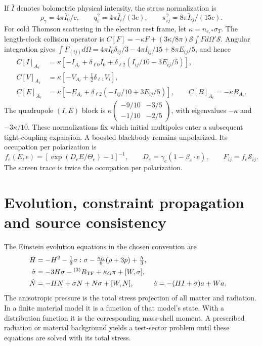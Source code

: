 If $\bar I$ denotes bolometric physical intensity, the stress normalization is
\begin{equation}
 \rho_\gamma=4\pi\bar I_0/c,\qquad
 q_i^\gamma=4\pi\bar I_i/(3c),\qquad
 \pi_{ij}^\gamma=8\pi\bar I_{ij}/(15c).
 \label{geo:intensity_stress}
\end{equation}
For cold Thomson scattering in the electron rest frame, let $\kappa=n_{e,*}\sigma_T$. The length-clock collision operator is
$C[F]=-\kappa F+(3\kappa/8\pi)\mathcal S\int Fd\Omega'\mathcal S$.
Angular integration gives
$\int F_{(ij)}d\Omega=4\pi I_0\delta_{ij}/3-4\pi I_{ij}/15+8\pi E_{ij}/5$,
and hence
\begin{align}
 C[I]_{A_\ell}&=\kappa[-I_{A_\ell}+\delta_{\ell0}I_0
           +\delta_{\ell2}(I_{ij}/10-3E_{ij}/5)],\nonumber\\
 C[V]_{A_\ell}&=\kappa[-V_{A_\ell}+\tfrac12\delta_{\ell1}V_i],\nonumber\\
 C[E]_{A_\ell}&=\kappa[-E_{A_\ell}
           +\delta_{\ell2}(-I_{ij}/10+3E_{ij}/5)],\qquad
 C[B]_{A_\ell}=-\kappa B_{A_\ell}.
 \label{geo:thomson_initial_blocks}
\end{align}
The quadrupole $(I,E)$ block is
$\kappa\left(\begin{smallmatrix}-9/10&-3/5\\-1/10&-2/5\end{smallmatrix}\right)$,
with eigenvalues $-\kappa$ and $-3\kappa/10$. These normalizations fix which initial multipoles enter a subsequent tight-coupling expansion. A boosted blackbody remains unpolarized. Its occupation per polarization is
\begin{equation}
 f_e(E,e)=[\exp(D_e E/\Theta_e)-1]^{-1},\qquad
 D_e=\gamma_e(1-\beta_e\cdot e),\qquad F_{ij}=f_e\mathcal S_{ij}.
 \label{geo:boosted_blackbody}
\end{equation}
The screen trace is twice the occupation per polarization.

\section{Evolution, constraint propagation and source consistency}

The Einstein evolution equations in the chosen convention are
\begin{align}
 \dot H&=-H^2-\tfrac13\sigma:\sigma
           -\tfrac{\kappa_G}{6}(\rho+3p)+\tfrac\Lambda3,
 \label{geo:raychaudhuri}\\
 \dot\sigma&=-3H\sigma-{}^{(3)}R_{\rm TF}+\kappa_G\pi+[W,\sigma],
 \label{geo:shear_evolution}\\
 \dot N&=-HN+\sigma N+N\sigma+[W,N],&
 \dot a&=-(HI+\sigma)a+Wa.
 \label{geo:structure_evolution}
\end{align}
The anisotropic pressure is the total stress projection of all matter and radiation. In a finite material model it is a function of that model's state. With a distribution function it is the corresponding mass-shell moment. A prescribed radiation or material background yields a test-sector problem until these equations are solved with its total stress.

